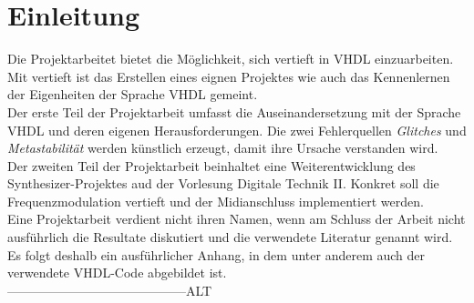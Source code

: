 
\chapter{Einleitung}\label{chap.einleitung}

Die Projektarbeitet bietet die Möglichkeit, sich vertieft in VHDL einzuarbeiten. Mit vertieft ist das Erstellen eines eignen Projektes wie auch  das Kennenlernen der Eigenheiten der Sprache VHDL gemeint.\\

Der erste Teil der Projektarbeit umfasst die Auseinandersetzung mit der Sprache VHDL und deren eigenen Herausforderungen. Die zwei Fehlerquellen \textit{Glitches} und \textit{Metastabilität} werden künstlich erzeugt, damit ihre Ursache verstanden wird. \\

Der zweiten Teil der Projektarbeit beinhaltet eine Weiterentwicklung des Synthesizer-Projektes aud der Vorlesung Digitale Technik II. Konkret soll die Frequenzmodulation vertieft  und der Midianschluss implementiert werden.\\

Eine Projektarbeit verdient nicht ihren Namen, wenn am Schluss der Arbeit nicht ausführlich die Resultate diskutiert und die verwendete Literatur genannt wird. Es folgt deshalb ein ausführlicher Anhang, in dem unter anderem auch der verwendete VHDL-Code abgebildet ist.\\

------------------------------------------ALT \\


